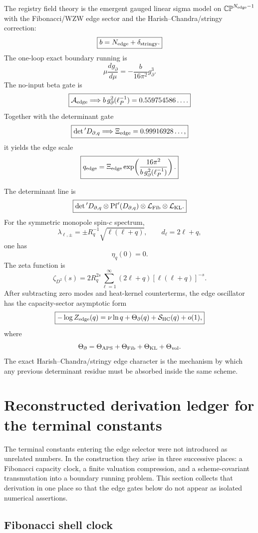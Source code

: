 \documentclass[aps,prd,reprint,nofootinbib,superscriptaddress,floatfix]{revtex4-2}
\numberwithin{equation}{section}
\theoremstyle{definition}
\theoremstyle{plain}
\begin{document}
The registry field theory is the emergent gauged linear sigma model on
\(\mathbb{CP}^{N_{\rm edge}-1}\) with the Fibonacci/WZW edge sector and the
Harish--Chandra/stringy correction:
\[
\boxed{
b
=
N_{\rm edge}+\delta_{\rm stringy}.
}
\]
The one-loop exact boundary running is
\[
\boxed{
\mu\frac{dg_\partial}{d\mu}
=
-\frac{b}{16\pi^2}g_\partial^3.
}
\]
The no-input beta gate is
\[
\boxed{
\mathcal A_{\rm edge}
\Longrightarrow
b\,g_\partial^2(\ell_P^{-1})
=
0.559754586\ldots .
}
\]
Together with the determinant gate
\[
\boxed{
\det{}'D_{\partial,q}
\Longrightarrow
\Xi_{\rm edge}=0.99916928\ldots ,
}
\]
it yields the edge scale
\[
\boxed{
q_{\rm edge}
=
\Xi_{\rm edge}
\exp\!\left(\frac{16\pi^2}{b\,g_\partial^2(\ell_P^{-1})}\right).
}
\]

The determinant line is
\[
\boxed{
\det{}'D_{\partial,q}
\otimes
{\rm Pf}'(D_{\partial,q})
\otimes
\mathcal L_{\rm Fib}
\otimes
\mathcal L_{\rm KL}.
}
\]
For the symmetric monopole spin-\(c\) spectrum,
\[
\lambda_{\ell,\pm}
=
\pm R_q^{-1}\sqrt{\ell(\ell+q)},\qquad
d_\ell=2\ell+q,
\]
one has
\[
\boxed{\eta_q(0)=0.}
\]
The zeta function is
\[
\zeta_{D^2}(s)
=
2R_q^{2s}
\sum_{\ell=1}^{\infty}
(2\ell+q)[\ell(\ell+q)]^{-s}.
\]
After subtracting zero modes and heat-kernel counterterms, the edge oscillator
has the capacity-sector asymptotic form
\[
\boxed{
-\log Z_{\rm edge}(q)
=
\nu\ln q+\Theta_{\partial}(q)
+\mathcal S_{\rm HC}(q)+o(1),
}
\]
where
\[
\Theta_{\partial}
=
\Theta_{\rm APS}
+
\Theta_{\rm Fib}
+
\Theta_{\rm KL}
+
\Theta_{\rm vol}.
\]
The exact Harish--Chandra/stringy edge character is the mechanism by which any
previous determinant residue must be absorbed inside the same scheme.



\section{Reconstructed derivation ledger for the terminal constants}
\label{sec:terminal-constants-ledger}

The terminal constants entering the edge selector were not introduced as
unrelated numbers.  In the construction they arise in three successive
places: a Fibonacci capacity clock, a finite valuation compression, and a
scheme-covariant transmutation into a boundary running problem.  This section
collects that derivation in one place so that the edge gates below do not
appear as isolated numerical assertions.

\subsection{Fibonacci shell clock}
\end{document}
